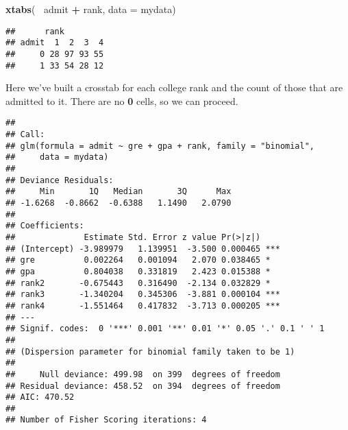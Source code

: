 \documentclass[]{article}
\newenvironment{Shaded}{\begin{snugshade}}{\end{snugshade}}
\newcommand{\KeywordTok}[1]{\textcolor[rgb]{0.13,0.29,0.53}{\textbf{#1}}}
\newcommand{\DataTypeTok}[1]{\textcolor[rgb]{0.13,0.29,0.53}{#1}}
\newcommand{\StringTok}[1]{\textcolor[rgb]{0.31,0.60,0.02}{#1}}
\newcommand{\OperatorTok}[1]{\textcolor[rgb]{0.81,0.36,0.00}{\textbf{#1}}}
\newcommand{\NormalTok}[1]{#1}
\begin{document}
\begin{Shaded}
\begin{Highlighting}[]
\KeywordTok{xtabs}\NormalTok{(}\OperatorTok{~}\StringTok{ }\NormalTok{admit }\OperatorTok{+}\StringTok{ }\NormalTok{rank, }\DataTypeTok{data =}\NormalTok{ mydata)}
\end{Highlighting}
\end{Shaded}

\begin{verbatim}
##      rank
## admit  1  2  3  4
##     0 28 97 93 55
##     1 33 54 28 12
\end{verbatim}

Here we've built a crosstab for each college rank and the count of those
that are admitted to it. There are no \textbf{0} cells, so we can
proceed.

\begin{Shaded}
\end{Shaded}

\begin{verbatim}
## 
## Call:
## glm(formula = admit ~ gre + gpa + rank, family = "binomial", 
##     data = mydata)
## 
## Deviance Residuals: 
##     Min       1Q   Median       3Q      Max  
## -1.6268  -0.8662  -0.6388   1.1490   2.0790  
## 
## Coefficients:
##              Estimate Std. Error z value Pr(>|z|)    
## (Intercept) -3.989979   1.139951  -3.500 0.000465 ***
## gre          0.002264   0.001094   2.070 0.038465 *  
## gpa          0.804038   0.331819   2.423 0.015388 *  
## rank2       -0.675443   0.316490  -2.134 0.032829 *  
## rank3       -1.340204   0.345306  -3.881 0.000104 ***
## rank4       -1.551464   0.417832  -3.713 0.000205 ***
## ---
## Signif. codes:  0 '***' 0.001 '**' 0.01 '*' 0.05 '.' 0.1 ' ' 1
## 
## (Dispersion parameter for binomial family taken to be 1)
## 
##     Null deviance: 499.98  on 399  degrees of freedom
## Residual deviance: 458.52  on 394  degrees of freedom
## AIC: 470.52
## 
## Number of Fisher Scoring iterations: 4
\end{verbatim}
\end{document}
